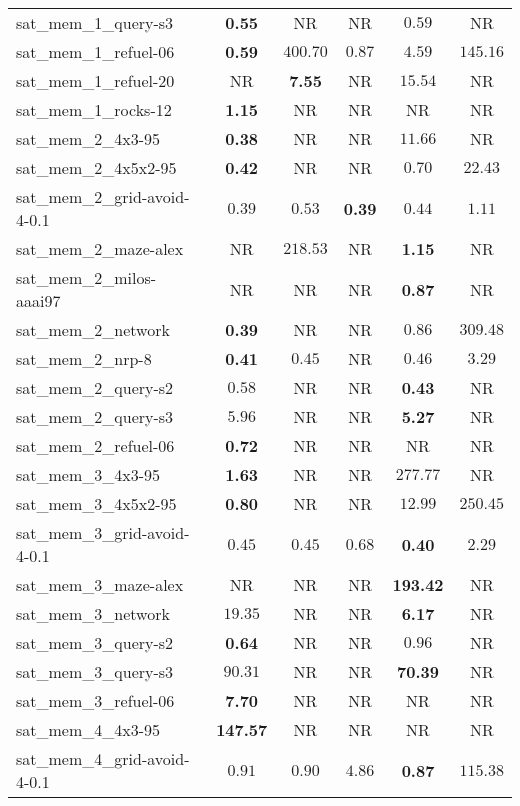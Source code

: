 \begin{tabular}{lccccc}
sat\_mem\_1\_query-s3 & \textbf{0.55} & NR & NR & $0.59$ & NR \\
sat\_mem\_1\_refuel-06 & \textbf{0.59} & $400.70$ & $0.87$ & $4.59$ & $145.16$ \\
sat\_mem\_1\_refuel-20 & NR & \textbf{7.55} & NR & $15.54$ & NR \\
sat\_mem\_1\_rocks-12 & \textbf{1.15} & NR & NR & NR & NR \\
sat\_mem\_2\_4x3-95 & \textbf{0.38} & NR & NR & $11.66$ & NR \\
sat\_mem\_2\_4x5x2-95 & \textbf{0.42} & NR & NR & $0.70$ & $22.43$ \\
sat\_mem\_2\_grid-avoid-4-0.1 & $0.39$ & $0.53$ & \textbf{0.39} & $0.44$ & $1.11$ \\
sat\_mem\_2\_maze-alex & NR & $218.53$ & NR & \textbf{1.15} & NR \\
sat\_mem\_2\_milos-aaai97 & NR & NR & NR & \textbf{0.87} & NR \\
sat\_mem\_2\_network & \textbf{0.39} & NR & NR & $0.86$ & $309.48$ \\
sat\_mem\_2\_nrp-8 & \textbf{0.41} & $0.45$ & NR & $0.46$ & $3.29$ \\
sat\_mem\_2\_query-s2 & $0.58$ & NR & NR & \textbf{0.43} & NR \\
sat\_mem\_2\_query-s3 & $5.96$ & NR & NR & \textbf{5.27} & NR \\
sat\_mem\_2\_refuel-06 & \textbf{0.72} & NR & NR & NR & NR \\
sat\_mem\_3\_4x3-95 & \textbf{1.63} & NR & NR & $277.77$ & NR \\
sat\_mem\_3\_4x5x2-95 & \textbf{0.80} & NR & NR & $12.99$ & $250.45$ \\
sat\_mem\_3\_grid-avoid-4-0.1 & $0.45$ & $0.45$ & $0.68$ & \textbf{0.40} & $2.29$ \\
sat\_mem\_3\_maze-alex & NR & NR & NR & \textbf{193.42} & NR \\
sat\_mem\_3\_network & $19.35$ & NR & NR & \textbf{6.17} & NR \\
sat\_mem\_3\_query-s2 & \textbf{0.64} & NR & NR & $0.96$ & NR \\
sat\_mem\_3\_query-s3 & $90.31$ & NR & NR & \textbf{70.39} & NR \\
sat\_mem\_3\_refuel-06 & \textbf{7.70} & NR & NR & NR & NR \\
sat\_mem\_4\_4x3-95 & \textbf{147.57} & NR & NR & NR & NR \\
sat\_mem\_4\_grid-avoid-4-0.1 & $0.91$ & $0.90$ & $4.86$ & \textbf{0.87} & $115.38$ \\

\end{tabular}
